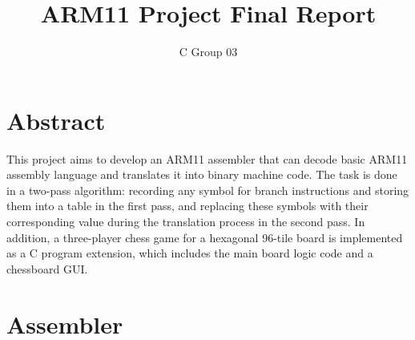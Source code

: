 \documentclass[10pt]{article}
\begin{document}
\title{ARM11 Project Final Report}
\author{C Group 03}

\maketitle

\section{Abstract}
This project aims to develop an ARM11 assembler that can decode basic ARM11 assembly language and translates it into binary machine code. The task is done in a two-pass algorithm: recording any symbol for branch instructions and storing them into a table in the first pass, and replacing these symbols with their corresponding value during the translation process in the second pass. In addition, a three-player chess game for a hexagonal 96-tile board is implemented as a C program extension, which includes the main board logic code and a chessboard GUI.
\section{Assembler}
\end{document}

